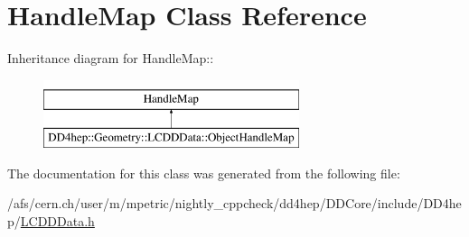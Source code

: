 \hypertarget{class_l_c_d_d_1_1_handle_map}{
\section{HandleMap Class Reference}
\label{class_l_c_d_d_1_1_handle_map}
}
Inheritance diagram for HandleMap::\begin{figure}[H]
\begin{center}
\leavevmode
\includegraphics[height=2cm]{class_l_c_d_d_1_1_handle_map}
\end{center}
\end{figure}


The documentation for this class was generated from the following file:\begin{DoxyCompactItemize}
\item 
/afs/cern.ch/user/m/mpetric/nightly\_\-cppcheck/dd4hep/DDCore/include/DD4hep/\hyperlink{_l_c_d_d_data_8h}{LCDDData.h}\end{DoxyCompactItemize}
